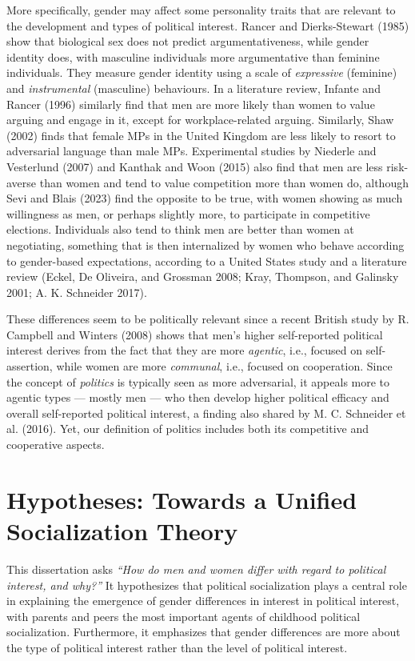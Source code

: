 \documentclass[
  letterpaper,
  DIV=11,
  numbers=noendperiod]{scrreprt}
\begin{document}
More specifically, gender may affect some personality traits that are
relevant to the development and types of political interest. Rancer and
Dierks-Stewart (1985) show that biological sex does not predict
argumentativeness, while gender identity does, with masculine
individuals more argumentative than feminine individuals. They measure
gender identity using a scale of \emph{expressive} (feminine) and
\emph{instrumental} (masculine) behaviours. In a literature review,
Infante and Rancer (1996) similarly find that men are more likely than
women to value arguing and engage in it, except for workplace-related
arguing. Similarly, Shaw (2002) finds that female MPs in the United
Kingdom are less likely to resort to adversarial language than male MPs.
Experimental studies by Niederle and Vesterlund (2007) and Kanthak and
Woon (2015) also find that men are less risk-averse than women and tend
to value competition more than women do, although Sevi and Blais (2023)
find the opposite to be true, with women showing as much willingness as
men, or perhaps slightly more, to participate in competitive elections.
Individuals also tend to think men are better than women at negotiating,
something that is then internalized by women who behave according to
gender-based expectations, according to a United States study and a
literature review (Eckel, De Oliveira, and Grossman 2008; Kray,
Thompson, and Galinsky 2001; A. K. Schneider 2017).

These differences seem to be politically relevant since a recent British
study by R. Campbell and Winters (2008) shows that men's higher
self-reported political interest derives from the fact that they are
more \emph{agentic}, i.e., focused on self-assertion, while women are
more \emph{communal}, i.e., focused on cooperation. Since the concept of
\emph{politics} is typically seen as more adversarial, it appeals more
to agentic types --- mostly men --- who then develop higher political
efficacy and overall self-reported political interest, a finding also
shared by M. C. Schneider et al. (2016). Yet, our definition of politics
includes both its competitive and cooperative aspects.

\section{Hypotheses: Towards a Unified Socialization
Theory}\label{hypotheses-towards-a-unified-socialization-theory}

This dissertation asks \emph{``How do men and women differ with regard
to political interest, and why?''} It hypothesizes that political
socialization plays a central role in explaining the emergence of gender
differences in interest in political interest, with parents and peers
the most important agents of childhood political socialization.
Furthermore, it emphasizes that gender differences are more about the
type of political interest rather than the level of political interest.
\end{document}
